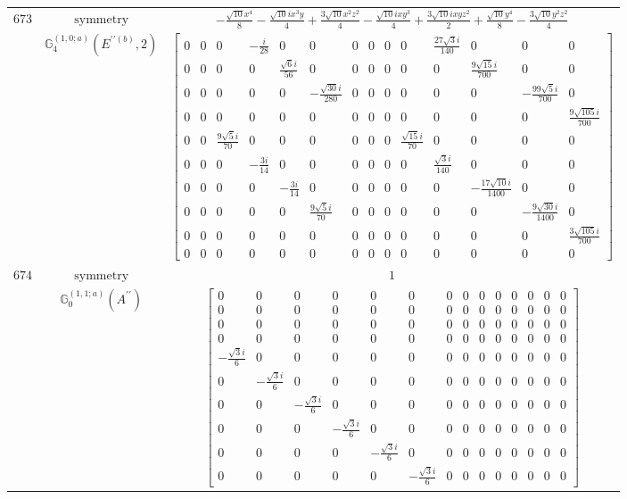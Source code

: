 \documentclass[fleqn,8pt,landscape]{jsarticle}
\begin{document}
\begin{longtable}{ccc}
$ 673 $ & $ \text{symmetry} $ & $ - \frac{\sqrt{10} x^{4}}{8} - \frac{\sqrt{10} i x^{3} y}{4} + \frac{3 \sqrt{10} x^{2} z^{2}}{4} - \frac{\sqrt{10} i x y^{3}}{4} + \frac{3 \sqrt{10} i x y z^{2}}{2} + \frac{\sqrt{10} y^{4}}{8} - \frac{3 \sqrt{10} y^{2} z^{2}}{4} $ \\
$  $ & $ \mathbb{G}_{4}^{(1,0;a)}(E^{\prime\prime(b)},2) $ & $ \begin{bmatrix} 0 & 0 & 0 & - \frac{i}{28} & 0 & 0 & 0 & 0 & 0 & 0 & \frac{27 \sqrt{3} i}{140} & 0 & 0 & 0 \\ 0 & 0 & 0 & 0 & \frac{\sqrt{6} i}{56} & 0 & 0 & 0 & 0 & 0 & 0 & \frac{9 \sqrt{15} i}{700} & 0 & 0 \\ 0 & 0 & 0 & 0 & 0 & - \frac{\sqrt{30} i}{280} & 0 & 0 & 0 & 0 & 0 & 0 & - \frac{99 \sqrt{5} i}{700} & 0 \\ 0 & 0 & 0 & 0 & 0 & 0 & 0 & 0 & 0 & 0 & 0 & 0 & 0 & \frac{9 \sqrt{105} i}{700} \\ 0 & 0 & \frac{9 \sqrt{5} i}{70} & 0 & 0 & 0 & 0 & 0 & 0 & \frac{\sqrt{15} i}{70} & 0 & 0 & 0 & 0 \\ 0 & 0 & 0 & - \frac{3 i}{14} & 0 & 0 & 0 & 0 & 0 & 0 & \frac{\sqrt{3} i}{140} & 0 & 0 & 0 \\ 0 & 0 & 0 & 0 & - \frac{3 i}{14} & 0 & 0 & 0 & 0 & 0 & 0 & - \frac{17 \sqrt{10} i}{1400} & 0 & 0 \\ 0 & 0 & 0 & 0 & 0 & \frac{9 \sqrt{5} i}{70} & 0 & 0 & 0 & 0 & 0 & 0 & - \frac{9 \sqrt{30} i}{1400} & 0 \\ 0 & 0 & 0 & 0 & 0 & 0 & 0 & 0 & 0 & 0 & 0 & 0 & 0 & \frac{3 \sqrt{105} i}{700} \\ 0 & 0 & 0 & 0 & 0 & 0 & 0 & 0 & 0 & 0 & 0 & 0 & 0 & 0 \end{bmatrix} $ \\ \hline
$ 674 $ & $ \text{symmetry} $ & $ 1 $ \\
$  $ & $ \mathbb{G}_{0}^{(1,1;a)}(A^{\prime\prime}) $ & $ \begin{bmatrix} 0 & 0 & 0 & 0 & 0 & 0 & 0 & 0 & 0 & 0 & 0 & 0 & 0 & 0 \\ 0 & 0 & 0 & 0 & 0 & 0 & 0 & 0 & 0 & 0 & 0 & 0 & 0 & 0 \\ 0 & 0 & 0 & 0 & 0 & 0 & 0 & 0 & 0 & 0 & 0 & 0 & 0 & 0 \\ 0 & 0 & 0 & 0 & 0 & 0 & 0 & 0 & 0 & 0 & 0 & 0 & 0 & 0 \\ - \frac{\sqrt{3} i}{6} & 0 & 0 & 0 & 0 & 0 & 0 & 0 & 0 & 0 & 0 & 0 & 0 & 0 \\ 0 & - \frac{\sqrt{3} i}{6} & 0 & 0 & 0 & 0 & 0 & 0 & 0 & 0 & 0 & 0 & 0 & 0 \\ 0 & 0 & - \frac{\sqrt{3} i}{6} & 0 & 0 & 0 & 0 & 0 & 0 & 0 & 0 & 0 & 0 & 0 \\ 0 & 0 & 0 & - \frac{\sqrt{3} i}{6} & 0 & 0 & 0 & 0 & 0 & 0 & 0 & 0 & 0 & 0 \\ 0 & 0 & 0 & 0 & - \frac{\sqrt{3} i}{6} & 0 & 0 & 0 & 0 & 0 & 0 & 0 & 0 & 0 \\ 0 & 0 & 0 & 0 & 0 & - \frac{\sqrt{3} i}{6} & 0 & 0 & 0 & 0 & 0 & 0 & 0 & 0 \end{bmatrix} $ \\ \hline

\end{longtable}
\end{document}
